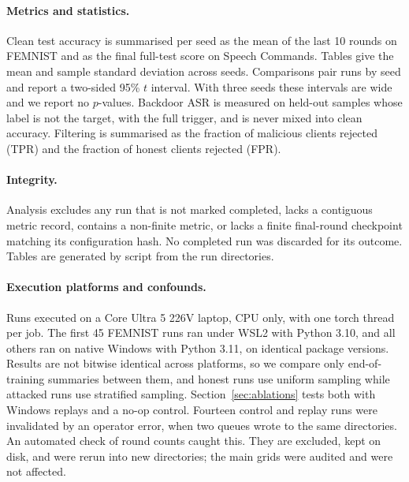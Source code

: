 \paragraph{Metrics and statistics.}
Clean test accuracy is summarised per seed as the mean of the last 10 rounds on FEMNIST and as the final full-test score on Speech Commands. Tables give the mean and sample standard deviation across seeds. Comparisons pair runs by seed and report a two-sided 95\% $t$ interval. With three seeds these intervals are wide and we report no $p$-values. Backdoor ASR is measured on held-out samples whose label is not the target, with the full trigger, and is never mixed into clean accuracy. Filtering is summarised as the fraction of malicious clients rejected (TPR) and the fraction of honest clients rejected (FPR).

\paragraph{Integrity.}
Analysis excludes any run that is not marked completed, lacks a contiguous metric record, contains a non-finite metric, or lacks a finite final-round checkpoint matching its configuration hash. No completed run was discarded for its outcome. Tables are generated by script from the run directories.

\paragraph{Execution platforms and confounds.}
Runs executed on a Core Ultra 5 226V laptop, CPU only, with one torch thread per job. The first 45 FEMNIST runs ran under WSL2 with Python 3.10, and all others ran on native Windows with Python 3.11, on identical package versions. Results are not bitwise identical across platforms, so we compare only end-of-training summaries between them, and honest runs use uniform sampling while attacked runs use stratified sampling. Section~\ref{sec:ablations} tests both with Windows replays and a no-op control. Fourteen control and replay runs were invalidated by an operator error, when two queues wrote to the same directories. An automated check of round counts caught this. They are excluded, kept on disk, and were rerun into new directories; the main grids were audited and were not affected.
